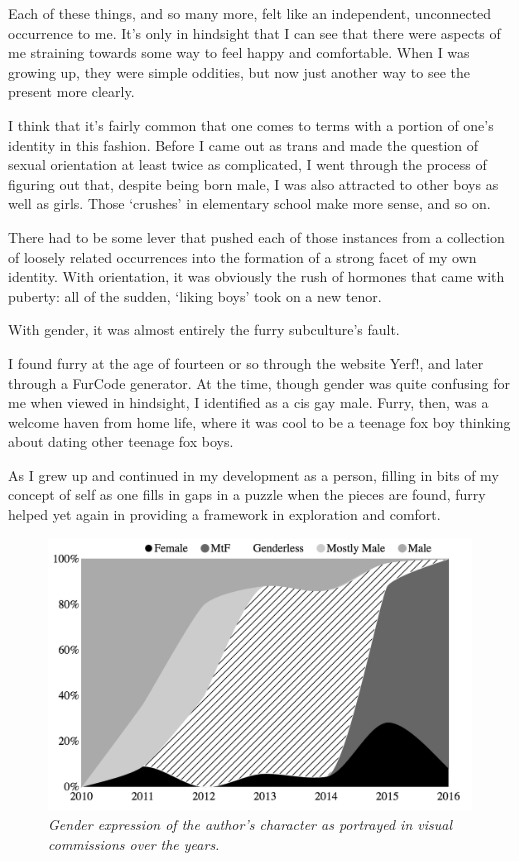 Each of these things, and so many more, felt like an independent, unconnected occurrence to me. It's only in hindsight that I can see that there were aspects of me straining towards some way to feel happy and comfortable. When I was growing up, they were simple oddities, but now just another way to see the present more clearly.

I think that it's fairly common that one comes to terms with a portion of one's identity in this fashion. Before I came out as trans and made the question of sexual orientation at least twice as complicated, I went through the process of figuring out that, despite being born male, I was also attracted to other boys as well as girls. Those `crushes' in elementary school make more sense, and so on.

There had to be some lever that pushed each of those instances from a collection of loosely related occurrences into the formation of a strong facet of my own identity. With orientation, it was obviously the rush of hormones that came with puberty: all of the sudden, `liking boys' took on a new tenor.

With gender, it was almost entirely the furry subculture's fault.

I found furry at the age of fourteen or so through the website Yerf!, and later through a FurCode generator. At the time, though gender was quite confusing for me when viewed in hindsight, I identified as a cis gay male. Furry, then, was a welcome haven from home life, where it was cool to be a teenage fox boy thinking about dating other teenage fox boys.

As I grew up and continued in my development as a person, filling in bits of my concept of self as one fills in gaps in a puzzle when the pieces are found, furry helped yet again in providing a framework in exploration and comfort.

\begin{figure}
  \centering
  \includegraphics[scale=0.45]{assets/commissions-sex-preview.png}
  \caption{\textit{Gender expression of the author's character as portrayed in visual commissions over the years.}}
  \label{fig:commissions-sex}
\end{figure}

